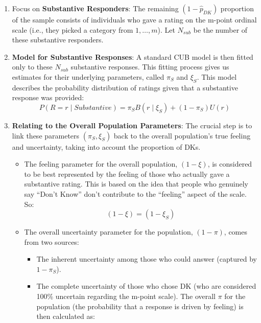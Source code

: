 \documentclass[
  letterpaper,
  DIV=11,
  numbers=noendperiod]{scrartcl}
\providecommand{\tightlist}{%
  \setlength{\itemsep}{0pt}\setlength{\parskip}{0pt}}\usepackage{longtable,booktabs,array}
\begin{document}
\begin{enumerate}
\def\labelenumi{\arabic{enumi}.}
\setcounter{enumi}{1}
\item
  Focus on \textbf{Substantive Responders}: The remaining
  \((1- \hat{p}_{DK})\) proportion of the sample consists of individuals
  who gave a rating on the m-point ordinal scale (i.e., they picked a
  category from \(1,…,m\)). Let \(N_{sub}\) be the number of these
  substantive responders.
\item
  \textbf{Model for Substantive Responses}: A standard CUB model is then
  fitted only to these \(N_{sub}\) substantive responses. This fitting
  process gives us estimates for their underlying parameters, called
  \(\pi_S\) and \(\xi_S\). This model describes the probability
  distribution of ratings given that a substantive response was
  provided: \[
   P(R = r \mid Substantive) = \pi_SB(r\mid\xi_S) + (1-\pi_S)U(r)
   \]
\item
  \textbf{Relating to the Overall Population Parameters}: The crucial
  step is to link these parameters \((\pi_S, \xi_S)\) back to the
  overall population's true feeling and uncertainty, taking into account
  the proportion of DKs.

  \begin{itemize}
  \item
    The feeling parameter for the overall population, \((1-\xi)\), is
    considered to be best represented by the feeling of those who
    actually gave a substantive rating. This is based on the idea that
    people who genuinely say ``Don't Know'' don't contribute to the
    ``feeling'' aspect of the scale. So: \[
    (1-\xi) = (1-\xi_S)
    \]
  \item
    The overall uncertainty parameter for the population, \((1-\pi)\),
    comes from two sources:

    \begin{itemize}
    \tightlist
    \item
      The inherent uncertainty among those who could answer (captured by
      \(1-\pi_S\)).
    \item
      The complete uncertainty of those who chose DK (who are considered
      100\% uncertain regarding the m-point scale). The overall \(\pi\)
      for the population (the probability that a response is driven by
      feeling) is then calculated as:
    \end{itemize}
  \end{itemize}
\end{enumerate}
\end{document}
